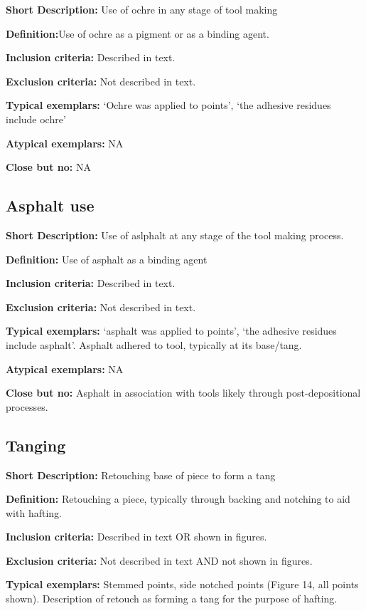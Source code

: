 \documentclass[
]{article}
\begin{document}
\textbf{Short Description:} Use of ochre in any stage of tool making

\textbf{Definition:}Use of ochre as a pigment or as a binding agent.

\textbf{Inclusion criteria:} Described in text.

\textbf{Exclusion criteria:} Not described in text.

\textbf{Typical exemplars:} `Ochre was applied to points', `the adhesive
residues include ochre'

\textbf{Atypical exemplars:} NA

\textbf{Close but no:} NA

\hypertarget{asphalt-use}{%
\subsection{Asphalt use}\label{asphalt-use}}

\textbf{Short Description:} Use of aslphalt at any stage of the tool
making process.

\textbf{Definition:} Use of asphalt as a binding agent

\textbf{Inclusion criteria:} Described in text.

\textbf{Exclusion criteria:} Not described in text.

\textbf{Typical exemplars:} `asphalt was applied to points', `the
adhesive residues include asphalt'. Asphalt adhered to tool, typically
at its base/tang.

\textbf{Atypical exemplars:} NA

\textbf{Close but no:} Asphalt in association with tools likely through
post-depositional processes.

\hypertarget{tanging}{%
\subsection{Tanging}\label{tanging}}

\textbf{Short Description:} Retouching base of piece to form a tang

\textbf{Definition:} Retouching a piece, typically through backing and
notching to aid with hafting.

\textbf{Inclusion criteria:} Described in text OR shown in figures.

\textbf{Exclusion criteria:} Not described in text AND not shown in
figures.

\textbf{Typical exemplars:} Stemmed points, side notched points (Figure
14, all points shown). Description of retouch as forming a tang for the
purpose of hafting.
\end{document}
